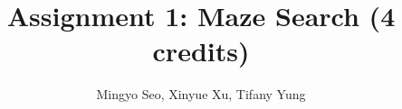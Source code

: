 \documentclass[10pt,letterpaper]{article}
\begin{document}
\setlength{\parskip}{1em}

\title{Assignment 1: Maze Search (4 credits)}
\author{Mingyo Seo, Xinyue Xu, Tifany Yung}
\maketitle




\end{document}
